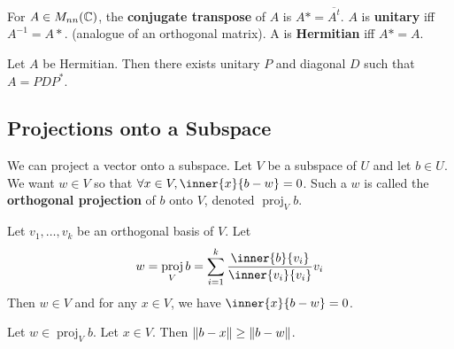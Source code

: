\documentclass{article}
\DeclareMathOperator{\proj}{proj}
\begin{document}
\begin{definition}
  For $A \in M_{nn}(\mathbb{C})$, the \textbf{conjugate transpose} of $A$ is $A* = \overline{A^t}$. $A$ is \textbf{unitary} iff $A^{-1} = A*$. (analogue of an orthogonal matrix). A is \textbf{Hermitian} iff $A* = A$.
\end{definition}
\begin{theorem}
  Let $A$ be Hermitian. Then there exists unitary $P$ and diagonal $D$ such that $A = PDP^*$.
\end{theorem}
\subsection{Projections onto a Subspace}
\begin{definition}
  We can project a vector onto a subspace. Let $V$ be a subspace of $U$ and let $b \in U$. We want $w \in V$ so that $\forall x \in V, \inner{x}{b-w} = 0$. Such a $w$ is called the \textbf{orthogonal projection} of $b$ onto $V$, denoted $\proj_Vb$.
\end{definition}
\begin{theorem}
  Let $v_1, \ldots, v_k$ be an orthogonal basis of $V$. Let \[
    w = \proj_Vb = \sum_{i=1}^k \frac{\inner{b}{v_i}}{\inner{v_i}{v_i}}v_i
  \]
  Then $w \in V$ and for any $x \in V$, we have $\inner{x}{b-w} = 0$.
\end{theorem}
\begin{theorem}
  Let $w \in \proj_Vb$. Let $x \in V$. Then $\norm{b-x} \geq \norm{b-w}$.
\end{theorem}
\end{document}
